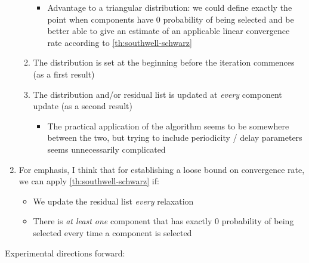 \documentclass{article}
\theoremstyle{definition}
\theoremstyle{example}
\theoremstyle{example}
\theoremstyle{example}
\begin{document}
\begin{enumerate}
\begin{enumerate}
\begin{itemize}
					\item Advantage to a triangular distribution: we could define exactly the point when components have 0 probability of being selected and be better able to give an estimate of an applicable linear convergence rate according to \cref{th:southwell-schwarz}
				\end{itemize}
			\item The distribution is set at the beginning before the iteration commences (as a first result)
			\item The distribution and/or residual list is updated at {\em every} component update (as a second result)
				\begin{itemize}
					\item The practical application of the algorithm seems to be somewhere between the two, but trying to include periodicity / delay parameters seems unnecessarily complicated
				\end{itemize}
		\end{enumerate}
	\item For emphasis, I think that for establishing a loose bound on convergence rate, we can apply \cref{th:southwell-schwarz} if:
		\begin{itemize}
			\item We update the residual list {\em every} relaxation
			\item There is {\em at least one} component that has exactly 0 probability of being selected every time a component is selected
		\end{itemize}
\end{enumerate}

Experimental directions forward:
\end{document}
